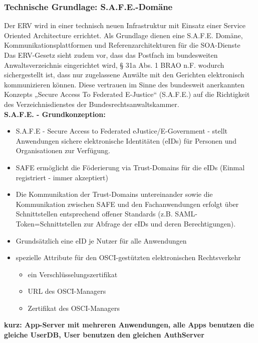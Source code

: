 \subsubsection{Technische Grundlage: S.A.F.E.-Domäne}
Der ERV wird in einer technisch neuen Infrastruktur mit Einsatz einer Service Oriented Architecture errichtet. Als Grundlage dienen eine S.A.F.E. Domäne, Kommunikationsplattformen und Referenzarchitekturen für die SOA-Dienste \\

Das ERV-Gesetz sieht zudem vor, dass das Postfach im bundesweiten Anwaltsverzeichnis eingerichtet wird, § 31a Abs. 1 BRAO n.F. wodurch sichergestellt ist, dass nur zugelassene Anwälte mit den Gerichten elektronisch kommunizieren können. Diese vertrauen im Sinne des bundesweit anerkannten Konzepts „Secure Access To Federated E-Justice“ (S.A.F.E.) auf die Richtigkeit des Verzeichnisdienstes der Bundesrechtsanwaltskammer. \\

\noindent
\textbf{S.A.F.E. - Grundkonzeption:}
\begin{itemize}
\item S.A.F.E - Secure Access to Federated eJustice/E-Government - stellt Anwendungen sichere elektronische Identitäten (eIDs) für Personen und Organisationen zur Verfügung. 
\item SAFE ermöglicht die Föderierung via Trust-Domains für die eIDs (Einmal registriert - immer akzeptiert) 
\item Die Kommunikation der Trust-Domains untereinander sowie die Kommunikation zwischen SAFE und den Fachanwendungen erfolgt über Schnittstellen entsprechend offener Standards (z.B. SAML-Token=Schnittstellen zur Abfrage der eIDs und deren Berechtigungen).
\item Grundsätzlich eine eID je Nutzer für alle Anwendungen
\item spezielle Attribute für den OSCI-gestützten elektronischen Rechtsverkehr
\begin{itemize}
\item ein Verschlüsselungszertifikat
\item URL des OSCI-Managers
\item Zertifikat des OSCI-Managers
\end{itemize}
\end{itemize}
\textbf{kurz: App-Server mit mehreren Anwendungen, alle Apps benutzen die gleiche UserDB, User benutzen den gleichen AuthServer}

